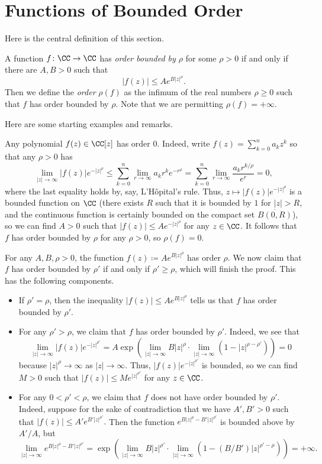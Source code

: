 \documentclass[notes.tex]{subfiles}
\begin{document}
\section{Functions of Bounded Order}
Here is the central definition of this section.
\begin{definition}[order]
	A function $f\colon\CC\to\CC$ has \textit{order bounded by $\rho$} for some $\rho>0$ if and only if there are $A,B>0$ such that
	\[|f(z)|\le Ae^{B|z|^\rho}.\]
	Then we define the \textit{order} $\rho(f)$ as the infimum of the real numbers $\rho\ge0$ such that $f$ has order bounded by $\rho$. Note that we are permitting $\rho(f)=+\infty$.
\end{definition}
Here are some starting examples and remarks.
\begin{example}
	Any polynomial $f(z)\in\CC[z]$ has order $0$. Indeed, write $f(z)=\sum_{k=0}^na_kz^k$ so that any $\rho>0$ has
	\[\lim_{|z|\to\infty}|f(z)|e^{-|z|^\rho}\le\sum_{k=0}^n\lim_{r\to\infty}a_kr^ke^{-r^\rho}=\sum_{k=0}^n\lim_{r\to\infty}\frac{a_kr^{k/\rho}}{e^r}=0,\]
	where the last equality holds by, say, L'H\^opital's rule. Thus, $z\mapsto|f(z)|e^{-|z|^\rho}$ is a bounded function on $\CC$ (there exists $R$ such that it is bounded by $1$ for $|z|>R$, and the continuous function is certainly bounded on the compact set $\overline{B(0,R)}$), so we can find $A>0$ such that $|f(z)|\le Ae^{-|z|^\rho}$ for any $z\in\CC$. It follows that $f$ has order bounded by $\rho$ for any $\rho>0$, so $\rho(f)=0$.
\end{example}
\begin{example} \label{ex:exp-orders}
	For any $A,B,\rho>0$, the function $f(z)\coloneqq Ae^{B|z|^\rho}$ has order $\rho$. We now claim that $f$ has order bounded by $\rho'$ if and only if $\rho'\ge\rho$, which will finish the proof. This has the following components.
	\begin{itemize}
		\item If $\rho'=\rho$, then the inequality $|f(z)|\le Ae^{B|z|^\rho}$ tells us that $f$ has order bounded by $\rho'$.
		\item For any $\rho'>\rho$, we claim that $f$ has order bounded by $\rho'$. Indeed, we see that
		\[\lim_{|z|\to\infty}|f(z)|e^{-|z|^{\rho'}}=A\exp\left(\lim_{|z|\to\infty}B|z|^\rho\cdot\lim_{|z|\to\infty}\left(1-|z|^{\rho-\rho'}\right)\right)=0\]
		because $|z|^\rho\to\infty$ as $|z|\to\infty$. Thus, $|f(z)|e^{-|z|^{\rho'}}$ is bounded, so we can find $M>0$ such that $|f(z)|\le Me^{|z|^{\rho'}}$ for any $z\in\CC$.
		\item For any $0<\rho'<\rho$, we claim that $f$ does not have order bounded by $\rho'$. Indeed, suppose for the sake of contradiction that we have $A',B'>0$ such that $|f(z)|\le A'e^{B'|z|^{\rho'}}.$ Then the function $e^{B|z|^\rho-B'|z|^{\rho'}}$ is bounded above by $A'/A$, but
		\[\lim_{|z|\to\infty}e^{B|z|^\rho-B'|z|^{\rho'}}=\exp\left(\lim_{|z|\to\infty}B|z|^{\rho'}\cdot\lim_{|z|\to\infty}\left(1-(B/B')|z|^{\rho'-\rho}\right)\right)=+\infty.\]
	\end{itemize}
\end{example}
\end{document}
